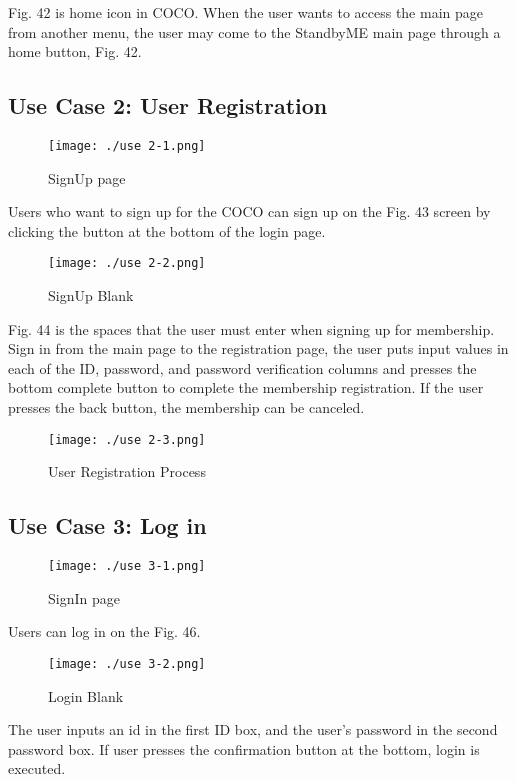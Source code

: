 \documentclass[conference]{IEEEtran}
\begin{document}
Fig. 42 is home icon in COCO. When the user wants to access the main page from another menu, the user may come to the StandbyME main page through a home button, Fig. 42.

\subsection{Use Case 2: User Registration}

\begin{figure}[H]
\texttt{[image: ./use 2-1.png]}
\centering
\caption{SignUp page}
\end{figure}

Users who want to sign up for the COCO can sign up on the Fig. 43 screen by clicking the button at the bottom of the login page.

\begin{figure}[H]
\texttt{[image: ./use 2-2.png]}
\centering
\caption{SignUp Blank}
\end{figure}

Fig. 44 is the spaces that the user must enter when signing up for membership. Sign in from the main page to the registration page, the user puts input values in each of the ID, password, and password verification columns and presses the bottom complete button to complete the membership registration. If the user presses the back button, the membership can be canceled.

\begin{figure}[H]
\texttt{[image: ./use 2-3.png]}
\centering
\caption{User Registration Process}
\end{figure}

\subsection{Use Case 3: Log in}

\begin{figure}[H]
\texttt{[image: ./use 3-1.png]}
\centering
\caption{SignIn page}
\end{figure}

Users can log in on the Fig. 46.

\begin{figure}[H]
\texttt{[image: ./use 3-2.png]}
\centering
\caption{Login Blank}
\end{figure}

The user inputs an id in the first ID box, and the user's password in the second password box. If user presses the confirmation button at the bottom, login is executed.
\end{document}
